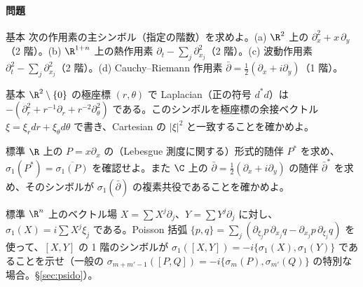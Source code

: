 \paragraph{問題}
\begin{prob}{基本}\label{p:symcalc}
次の作用素の主シンボル（指定の階数）を求めよ。(a) $\R^2$ 上の $\partial_x^2+x\,\partial_y$（2 階）。(b) $\R^{1+n}$ 上の熱作用素 $\partial_t-\sum_j\partial_{x_j}^2$（2 階）。(c) 波動作用素 $\partial_t^2-\sum_j\partial_{x_j}^2$（2 階）。(d) Cauchy--Riemann 作用素 $\bar\partial=\frac12(\partial_x+i\partial_y)$（1 階）。
\end{prob}
\begin{prob}{基本}\label{p:polar}
$\R^2\setminus\{0\}$ の極座標 $(r,\theta)$ で Laplacian（正の符号 $d^*d$）は $-(\partial_r^2+r^{-1}\partial_r+r^{-2}\partial_\theta^2)$ である。このシンボルを極座標の余接ベクトル $\xi=\xi_rdr+\xi_\theta d\theta$ で書き、Cartesian の $|\xi|^2$ と一致することを確かめよ。
\end{prob}
\begin{prob}{標準}\label{p:adjsym}
$\R$ 上の $P=x\partial_x$ の（Lebesgue 測度に関する）形式的随伴 $P^*$ を求め、$\sigma_1(P^*)=\overline{\sigma_1(P)}$ を確認せよ。また $\C$ 上の $\bar\partial=\frac12(\partial_x+i\partial_y)$ の随伴 $\bar\partial^*$ を求め、そのシンボルが $\sigma_1(\bar\partial)$ の複素共役であることを確かめよ。
\end{prob}
\begin{prob}{標準}\label{p:poisson}
$\R^n$ 上のベクトル場 $X=\sum X^j\partial_j$、$Y=\sum Y^j\partial_j$ に対し、$\sigma_1(X)=i\sum X^j\xi_j$ である。Poisson 括弧 $\{p,q\}=\sum_j(\partial_{\xi_j}p\,\partial_{x_j}q-\partial_{x_j}p\,\partial_{\xi_j}q)$ を使って、$[X,Y]$ の 1 階のシンボルが $\sigma_1([X,Y])=-i\{\sigma_1(X),\sigma_1(Y)\}$ であることを示せ（一般の $\sigma_{m+m'-1}([P,Q])=-i\{\sigma_m(P),\sigma_{m'}(Q)\}$ の特別な場合。\S\ref{sec:psido}）。
\end{prob}

